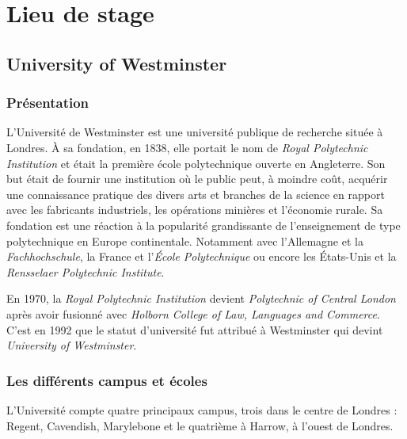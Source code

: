 \chapter{Lieu de stage}

\section{University of Westminster}

\subsection{Pr\'esentation}

L'Universit\'e de Westminster est une universit\'e publique de recherche situ\'ee \`a Londres. 
\`A sa fondation, en 1838, elle portait le nom de \textit{Royal Polytechnic Institution} et \'etait la premi\`ere \'ecole polytechnique ouverte en Angleterre.
Son but \'etait de fournir une institution o\`u le public peut, \`a moindre co\^ut, acqu\'erir une connaissance pratique des divers arts et branches de la science en rapport avec les fabricants industriels, les op\'erations mini\`eres et l'\'economie rurale.
Sa fondation est une r\'eaction \`a la popularit\'e grandissante de l'enseignement de type polytechnique en Europe continentale. 
Notamment avec l'Allemagne et la \textit{Fachhochschule}, la France et l'\textit{\'Ecole Polytechnique} ou encore les \'Etats-Unis et la \textit{Rensselaer Polytechnic Institute}.

En 1970, la \textit{Royal Polytechnic Institution} devient \textit{Polytechnic of Central London} apr\`es avoir fusionn\'e avec \textit{Holborn College of Law, Languages and Commerce}.
C'est en 1992 que le statut d'universit\'e fut attribu\'e \`a Westminster qui devint \textit{University of Westminster}.

\subsection{Les diff\'erents campus et \'ecoles}
\label{section:campus}

L'Universit\'e compte quatre principaux campus, trois dans le centre de Londres : Regent, Cavendish, Marylebone et le quatri\`eme \`a Harrow, \`a l'ouest de Londres.

